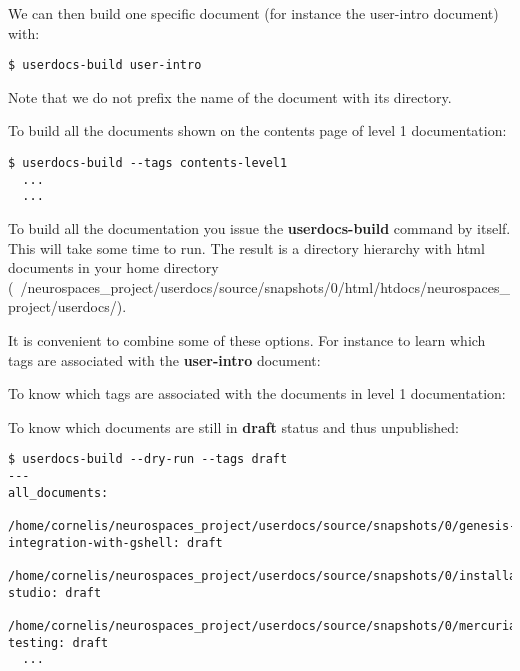 \documentclass[12pt]{article}
\begin{document}


We can then build one specific document (for instance the user-intro
document) with:

\begin{verbatim}
$ userdocs-build user-intro
\end{verbatim}

Note that we do not prefix the name of the document with its
directory.

To build all the documents shown on the contents page of level 1
documentation:

\begin{verbatim}
$ userdocs-build --tags contents-level1
  ...
  ...
\end{verbatim}

To build all the documentation you issue the {\bf userdocs-build}
command by itself.  This will take some time to run.  The result is a
directory hierarchy with html documents in your home directory
(~/neurospaces\_project/userdocs/source/snapshots/0/html/htdocs/neurospaces\_project/userdocs/).

It is convenient to combine some of these options.  For instance to
learn which tags are associated with the {\bf user-intro} document:


To know which tags are associated with the documents in level 1
documentation:


To know which documents are still in {\bf draft} status and thus
unpublished:

\begin{verbatim}
$ userdocs-build --dry-run --tags draft
---
all_documents:
  /home/cornelis/neurospaces_project/userdocs/source/snapshots/0/genesis-integration-with-gshell: draft
  /home/cornelis/neurospaces_project/userdocs/source/snapshots/0/installation-studio: draft
  /home/cornelis/neurospaces_project/userdocs/source/snapshots/0/mercurial-testing: draft
  ...
\end{verbatim}
\end{document}
